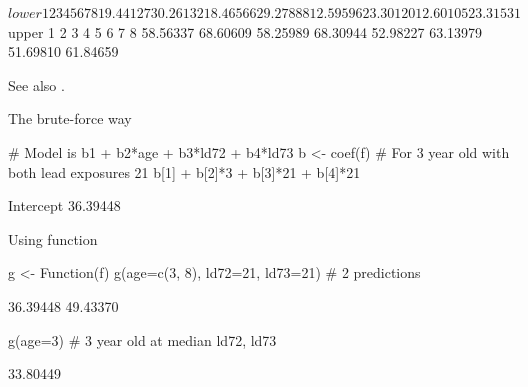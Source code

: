 \begin{Schunk}
\begin{Soutput}
$lower
       1        2        3        4        5        6        7        8 
19.44127 30.26132 18.46566 29.27888 12.59596 23.30120 12.60105 23.31531 

$upper
       1        2        3        4        5        6        7        8 
58.56337 68.60609 58.25989 68.30944 52.98227 63.13979 51.69810 61.84659 
\end{Soutput}
\end{Schunk}
See also .
\item The brute-force way
\begin{Schunk}
\begin{Sinput}
# Model is b1 + b2*age + b3*ld72 + b4*ld73
b <- coef(f)
# For 3 year old with both lead exposures 21
b[1] + b[2]*3 + b[3]*21 + b[4]*21
\end{Sinput}
\begin{Soutput}
Intercept 
 36.39448 
\end{Soutput}
\end{Schunk}
\item Using  function \ipacue
\begin{Schunk}
\begin{Sinput}
g <- Function(f)
g(age=c(3, 8), ld72=21, ld73=21)       # 2 predictions
\end{Sinput}
\begin{Soutput}
[1] 36.39448 49.43370
\end{Soutput}
\begin{Sinput}
g(age=3)              # 3 year old at median ld72, ld73
\end{Sinput}
\begin{Soutput}
[1] 33.80449
\end{Soutput}
\end{Schunk}
\ei

